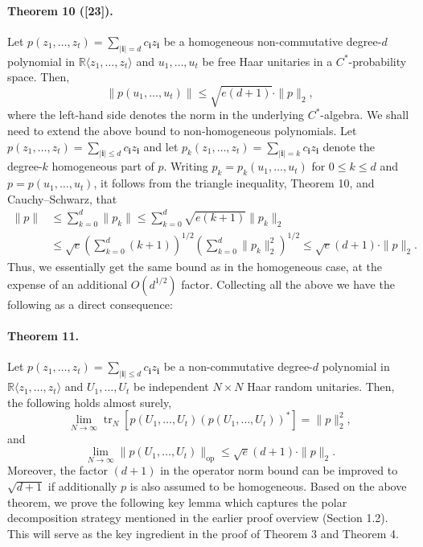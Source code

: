 \paragraph{Theorem 10 ([23]).}
Let $p(z_1,\ldots,z_t)=\sum_{|\mathbf i|=d}c_{\mathbf i}z_{\mathbf i}$ be a homogeneous non-commutative degree-$d$ polynomial in $\mathbb R\langle z_1,\ldots,z_t\rangle$ and $u_1,\ldots,u_t$ be free Haar unitaries in a $C^*$-probability space. Then,
\[\|p(u_1,\ldots,u_t)\|\leq\sqrt{e(d+1)}\cdot\|p\|_2,\]
where the left-hand side denotes the norm in the underlying $C^*$-algebra.
We shall need to extend the above bound to non-homogeneous polynomials. Let $p(z_1,\ldots,z_t)=\sum_{|\mathbf i|\leq d}c_{\mathbf i}z_{\mathbf i}$ and let $p_k(z_1,\ldots,z_t)=\sum_{|\mathbf i|=k}c_{\mathbf i}z_{\mathbf i}$ denote the degree-$k$ homogeneous part of $p$. Writing $p_k=p_k(u_1,\ldots,u_t)$ for $0\leq k\leq d$ and $p=p(u_1,\ldots,u_t)$, it follows from the triangle inequality, Theorem 10, and Cauchy--Schwarz, that
\begin{align*}
\|p\|&\leq\sum_{k=0}^d\|p_k\|\leq\sum_{k=0}^d\sqrt{e(k+1)}\|p_k\|_2\\
&\leq\sqrt e\left(\sum_{k=0}^d(k+1)\right)^{1/2}\left(\sum_{k=0}^d\|p_k\|_2^2\right)^{1/2}\leq\sqrt e(d+1)\cdot\|p\|_2.
\end{align*}
Thus, we essentially get the same bound as in the homogeneous case, at the expense of an additional $O(d^{1/2})$ factor.
Collecting all the above we have the following as a direct consequence:
\paragraph{Theorem 11.}
Let $p(z_1,\ldots,z_t)=\sum_{|\mathbf i|\leq d}c_{\mathbf i}z_{\mathbf i}$ be a non-commutative degree-$d$ polynomial in $\mathbb R\langle z_1,\ldots,z_t\rangle$ and $U_1,\ldots,U_t$ be independent $N\times N$ Haar random unitaries. Then, the following holds almost surely,
\[\lim_{N\to\infty}\operatorname{tr}_N[p(U_1,\ldots,U_t)(p(U_1,\ldots,U_t))^*]=\|p\|_2^2,\]
and
\[\lim_{N\to\infty}\|p(U_1,\ldots,U_t)\|_{\mathrm{op}}\leq\sqrt e(d+1)\cdot\|p\|_2.\]
Moreover, the factor $(d+1)$ in the operator norm bound can be improved to $\sqrt{d+1}$ if additionally $p$ is also assumed to be homogeneous.
Based on the above theorem, we prove the following key lemma which captures the polar decomposition strategy mentioned in the earlier proof overview (Section 1.2). This will serve as the key ingredient in the proof of Theorem 3 and Theorem 4.
